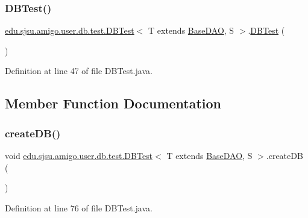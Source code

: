 \subsubsection{\texorpdfstring{D\+B\+Test()}{DBTest()}}
{\footnotesize\ttfamily \hyperlink{classedu_1_1sjsu_1_1amigo_1_1user_1_1db_1_1test_1_1_d_b_test}{edu.\+sjsu.\+amigo.\+user.\+db.\+test.\+D\+B\+Test}$<$ T extends \hyperlink{interfaceedu_1_1sjsu_1_1amigo_1_1db_1_1common_1_1_base_d_a_o}{Base\+D\+AO}, S $>$.\hyperlink{classedu_1_1sjsu_1_1amigo_1_1user_1_1db_1_1test_1_1_d_b_test}{D\+B\+Test} (\begin{DoxyParamCaption}{ }\end{DoxyParamCaption})}



Definition at line 47 of file D\+B\+Test.\+java.



\subsection{Member Function Documentation}
\mbox{\label{classedu_1_1sjsu_1_1amigo_1_1user_1_1db_1_1test_1_1_d_b_test_a5c7a1235c61d59451a19874e8c06b2ac}} 
\subsubsection{\texorpdfstring{create\+D\+B()}{createDB()}}
{\footnotesize\ttfamily void \hyperlink{classedu_1_1sjsu_1_1amigo_1_1user_1_1db_1_1test_1_1_d_b_test}{edu.\+sjsu.\+amigo.\+user.\+db.\+test.\+D\+B\+Test}$<$ T extends \hyperlink{interfaceedu_1_1sjsu_1_1amigo_1_1db_1_1common_1_1_base_d_a_o}{Base\+D\+AO}, S $>$.create\+DB (\begin{DoxyParamCaption}{ }\end{DoxyParamCaption})}



Definition at line 76 of file D\+B\+Test.\+java.

\mbox{\label{classedu_1_1sjsu_1_1amigo_1_1user_1_1db_1_1test_1_1_d_b_test_a0143d91f1c2120b6e72a2c1724b1beae}} 

